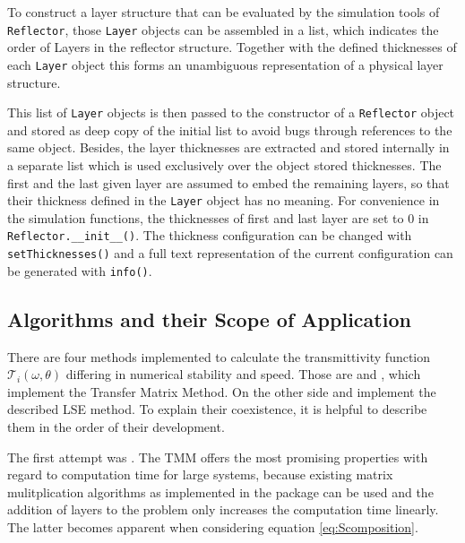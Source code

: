 To construct a layer structure that can be evaluated by the simulation tools of
\texttt{Reflector}, those \texttt{Layer} objects can be assembled in a list,
which indicates the order of Layers in the reflector structure. Together with
the defined thicknesses of each \texttt{Layer} object this forms an unambiguous
representation of a physical layer structure.

This list of \texttt{Layer} objects is then passed to the constructor of a
\texttt{Reflector} object and stored as deep copy of the initial list to avoid
bugs through references to the same object. Besides, the layer thicknesses are
extracted and stored internally in a separate list which is used exclusively
over the object stored thicknesses. The first and the last given
layer are assumed to embed the remaining layers, so that their thickness
defined in the \texttt{Layer} object has no meaning. For convenience in the
simulation functions, the thicknesses of first and last layer are set to $0$
in \texttt{Reflector.\_\_init\_\_()}. The thickness configuration can be
changed
with \texttt{setThicknesses()} and a full text representation of the current
configuration can be generated with \texttt{info()}.

\subsection{Algorithms and their Scope of Application }
There are four methods implemented to calculate the transmittivity function
$\mathcal{T}_i(\omega, \theta)$ differing in numerical stability and speed.
Those are  and , which implement
the Transfer Matrix Method. On the other side  and
 implement the described LSE method.
To explain their coexistence, it is helpful to describe them in the order of
their development.

The first attempt was . The TMM offers the most promising
properties with regard to computation time for large systems, because existing
matrix mulitplication algorithms as implemented in the  package can
be used and the addition of layers to the problem only increases the
computation time linearly. The latter becomes apparent when considering
equation \ref{eq:Scomposition}.

